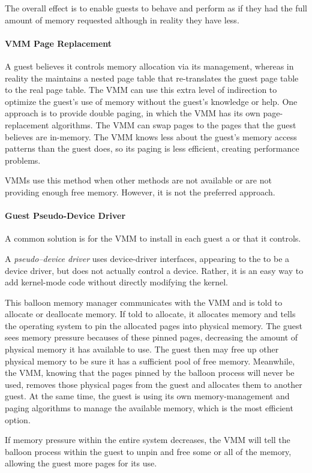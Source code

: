 The overall effect is to enable guests to behave and perform as if they had the full amount of memory requested although in reality they have less.

\paragraph{VMM Page Replacement}\label{par:VMM_Page_Replacement}
A guest believes it controls memory allocation via its  management, whereas in reality the  maintains a nested page table that re-translates the guest page table to the real page table.
The VMM can use this extra level of indirection to optimize the guest’s use of memory without the guest’s knowledge or help.
One approach is to provide double paging, in which the VMM has its own page-replacement algorithms.
The VMM can swap pages to the  pages that the guest believes are in-memory.
The VMM knows less about the guest's memory access patterns than the guest does, so its paging is less efficient, creating performance problems.

VMMs use this method when other methods are not available or are not providing enough free memory.
However, it is not the preferred approach.

\paragraph{Guest Pseudo-Device Driver}\label{par:VM_Mem_Kernel_Module}
A common solution is for the VMM to install in each guest a  or  that it controls.

\begin{definition}\label{def:Pseudo_Device_Driver}
  A \emph{pseudo–device driver} uses device-driver interfaces, appearing to the  to be a device driver, but does not actually control a device.
  Rather, it is an easy way to add kernel-mode code without directly modifying the kernel.
\end{definition}

This balloon memory manager communicates with the VMM and is told to allocate or deallocate memory.
If told to allocate, it allocates memory and tells the operating system to pin the allocated pages into physical memory.
The guest sees memory pressure becauses of these pinned pages, decreasing the amount of physical memory it has available to use.
The guest then may free up other physical memory to be sure it has a sufficient pool of free memory.
Meanwhile, the VMM, knowing that the pages pinned by the balloon process will never be used, removes those physical pages from the guest and allocates them to another guest.
At the same time, the guest is using its own memory-management and paging algorithms to manage the available memory, which is the most efficient option.

If memory pressure within the entire system decreases, the VMM will tell the balloon process within the guest to unpin and free some or all of the memory, allowing the guest more pages for its use.


